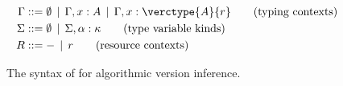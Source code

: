 \begin{figure}[tb]
\begin{align*}
\Gamma & ::= \emptyset \,\mid\, \Gamma, x:A \,\mid\, \Gamma, x:\verctype{A}{r} \tag{typing contexts}\\
\Sigma & ::= \emptyset \,\mid\, \Sigma, \alpha:\kappa \tag{type variable kinds}\\
R      & ::= - \,\mid\, r \tag{resource contexts}
\end{align*}
\caption{The syntax of \vlmini{} for algorithmic version inference.}
\label{syntax:versioninference}
\end{figure}